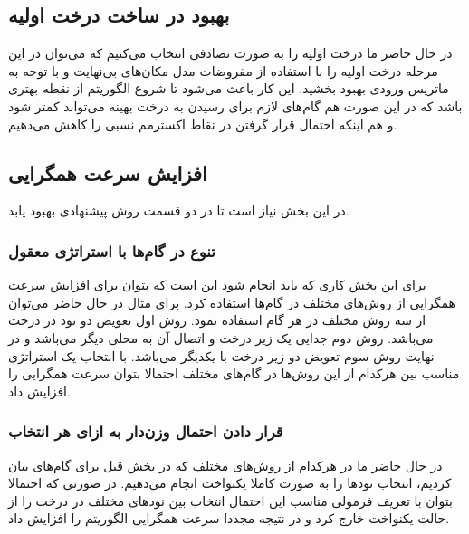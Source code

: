 \subsection{بهبود در ساخت درخت اولیه}
در حال حاضر ما درخت اولیه را به صورت تصادفی انتخاب می‌کنیم که می‌توان در این مرحله درخت اولیه را با استفاده از مفروضات مدل مکان‌های بی‌نهایت و با توجه به ماتریس ورودی بهبود بخشید. این کار باعث می‌شود تا شروع الگوریتم از نقطه بهتری باشد که در این صورت هم گام‌های لازم برای رسیدن به درخت بهینه می‌تواند کمتر شود و هم اینکه احتمال قرار گرفتن در نقاط اکسترمم نسبی را کاهش می‌دهیم.

\subsection{افزایش سرعت همگرایی }
در این بخش نیاز است تا در دو قسمت روش پیشنهادی بهبود یابد.
\subsubsection{تنوع در گام‌ها با استراتژی معقول}
برای این بخش کاری که باید انجام شود این است که بتوان برای افزایش سرعت همگرایی از روش‌های مختلف در گام‌ها استفاده کرد. برای مثال در حال حاضر می‌توان از سه روش مختلف در هر گام استفاده نمود. روش اول تعویض دو نود در درخت می‌باشد. روش دوم جدایی یک زیر درخت و اتصال آن به محلی دیگر می‌باشد و  در نهایت روش سوم تعویض دو زیر درخت با یکدیگر می‌باشد. با انتخاب یک استراتژی مناسب بین هرکدام از این روش‌ها در گام‌های مختلف احتمالا بتوان سرعت همگرایی را افزایش داد.

\subsubsection{قرار دادن احتمال وزن‌دار به ازای هر انتخاب}
در حال حاضر ما در هرکدام از روش‌های مختلف که در بخش قبل برای گام‌های  بیان کردیم، انتخاب نودها را به صورت کاملا یکنواخت انجام می‌دهیم. در صورتی که احتمالا بتوان با تعریف فرمولی مناسب این احتمال انتخاب بین نودهای مختلف در درخت را از حالت یکنواخت خارج کرد و در نتیجه مجددا سرعت همگرایی الگوریتم را افزایش داد.
